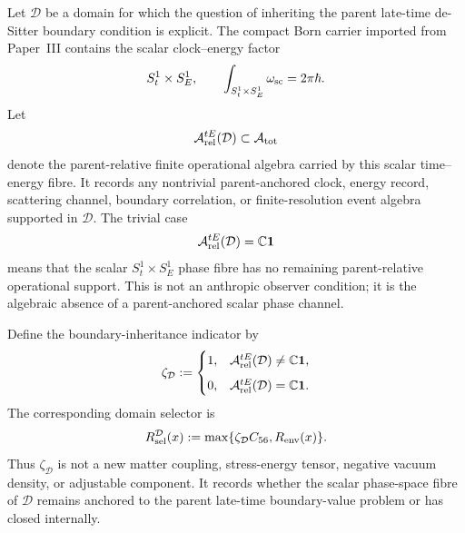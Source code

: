 \documentclass[12pt,a4paper]{article}
\begin{document}
\begin{definition}
\label{p8:def:detached-cap-selector}
Let \(\mathcal D\) be a domain for which the question of inheriting the parent late-time de-Sitter boundary condition is explicit.  The compact Born carrier imported from Paper~III contains the scalar clock--energy factor
\[
    S^1_t\times S^1_E,
    \qquad
    \int_{S^1_t\times S^1_E}\omega_{\rm sc}=2\pi\hbar .
\]
Let
\[
    \mathcal A^{tE}_{\rm rel}(\mathcal D)\subset \mathcal A_{\rm tot}
\]
denote the parent-relative finite operational algebra carried by this scalar time--energy fibre.  It records any nontrivial parent-anchored clock, energy record, scattering channel, boundary correlation, or finite-resolution event algebra supported in \(\mathcal D\).  The trivial case
\[
    \mathcal A^{tE}_{\rm rel}(\mathcal D)=\mathbb C\mathbf 1
\]
means that the scalar \(S^1_t\times S^1_E\) phase fibre has no remaining parent-relative operational support.  This is not an anthropic observer condition; it is the algebraic absence of a parent-anchored scalar phase channel.

Define the boundary-inheritance indicator by
\begin{equation}
\label{p8:eq:zeta-scalar-phase-definition}
\zeta_{\mathcal D}:=
\begin{cases}
1,& \mathcal A^{tE}_{\rm rel}(\mathcal D)\neq\mathbb C\mathbf 1,\\[2mm]
0,& \mathcal A^{tE}_{\rm rel}(\mathcal D)=\mathbb C\mathbf 1.
\end{cases}
\end{equation}
The corresponding domain selector is
\begin{equation}
\label{p8:eq:domain-floor-selector}
    R_{\rm sel}^{\mathcal D}(x)
    :=
    \max\{\zeta_{\mathcal D}C_{56},R_{\rm env}(x)\}.
\end{equation}
Thus \(\zeta_{\mathcal D}\) is not a new matter coupling, stress-energy tensor, negative vacuum density, or adjustable component.  It records whether the scalar phase-space fibre of \(\mathcal D\) remains anchored to the parent late-time boundary-value problem or has closed internally.
\end{definition}
\end{document}
